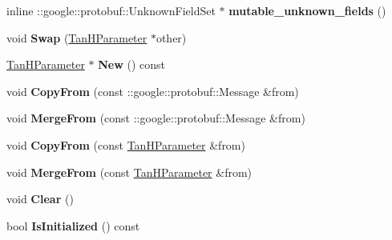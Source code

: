 \begin{DoxyCompactItemize}
inline \+::google\+::protobuf\+::\+Unknown\+Field\+Set $\ast$ {\bfseries mutable\+\_\+unknown\+\_\+fields} ()
\item 
\mbox{\label{classcaffe_1_1_tan_h_parameter_a0d029e1798c0d9110432cf7adac47324}} 
void {\bfseries Swap} (\mbox{\hyperlink{classcaffe_1_1_tan_h_parameter}{Tan\+H\+Parameter}} $\ast$other)
\item 
\mbox{\label{classcaffe_1_1_tan_h_parameter_ad965480ba281abc4edf9e94b7cb6bb1c}} 
\mbox{\hyperlink{classcaffe_1_1_tan_h_parameter}{Tan\+H\+Parameter}} $\ast$ {\bfseries New} () const
\item 
\mbox{\label{classcaffe_1_1_tan_h_parameter_a6291e8a6f3d5a059cf443338ee20f477}} 
void {\bfseries Copy\+From} (const \+::google\+::protobuf\+::\+Message \&from)
\item 
\mbox{\label{classcaffe_1_1_tan_h_parameter_a9dbf45013827869ead76b3f1afff59f8}} 
void {\bfseries Merge\+From} (const \+::google\+::protobuf\+::\+Message \&from)
\item 
\mbox{\label{classcaffe_1_1_tan_h_parameter_aa37b53a4d9a9cf5ebd0cb4491378250a}} 
void {\bfseries Copy\+From} (const \mbox{\hyperlink{classcaffe_1_1_tan_h_parameter}{Tan\+H\+Parameter}} \&from)
\item 
\mbox{\label{classcaffe_1_1_tan_h_parameter_ae8e8c3cb564d4c42e629ee4e0ace3ab6}} 
void {\bfseries Merge\+From} (const \mbox{\hyperlink{classcaffe_1_1_tan_h_parameter}{Tan\+H\+Parameter}} \&from)
\item 
\mbox{\label{classcaffe_1_1_tan_h_parameter_aa5abc1607ac6fa39511d4e759ebbb826}} 
void {\bfseries Clear} ()
\item 
\mbox{\label{classcaffe_1_1_tan_h_parameter_a40812336395c065837e95634d042da77}} 
bool {\bfseries Is\+Initialized} () const
\item 
\mbox{\label{classcaffe_1_1_tan_h_parameter_ac79d5fe9b2b48cb1836034cf8ea3f9cc}} 

\end{DoxyCompactItemize}
